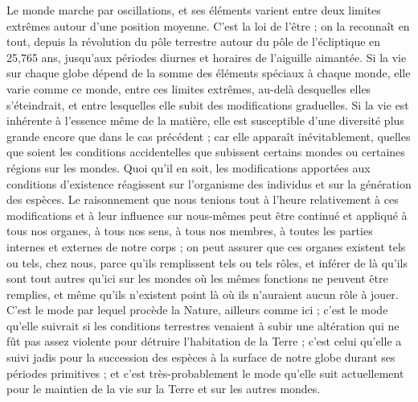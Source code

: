 \documentclass[a4paper, 11pt, oneside, landscape]{article}
\begin{document}
Le monde marche par oscillations, et ses éléments varient entre deux limites extrêmes autour d'une position moyenne. C'est la loi de l'être ; on la reconnaît en tout, depuis la révolution du pôle terrestre autour du pôle de l'écliptique en 25,765 ans, jusqu'aux périodes diurnes et horaires de l'aiguille aimantée. Si la vie sur chaque globe dépend de la somme des éléments spéciaux à chaque monde, elle varie comme ce monde, entre ces limites extrêmes, au-delà desquelles elles s'éteindrait, et entre lesquelles elle subit des modifications graduelles. Si la vie est inhérente à l'essence même de la matière, elle est susceptible d'une diversité plus grande encore que dans le cas précédent ; car elle apparaît inévitablement, quelles que soient les conditions accidentelles que subissent certains mondes ou certaines régions sur les mondes. Quoi qu'il en soit, les modifications apportées aux conditions d'existence réagissent sur l'organisme des individus et sur la génération des espèces. Le raisonnement que nous tenions tout à l'heure relativement à ces modifications et à leur influence sur nous-mêmes peut être continué et appliqué à tous nos organes, à tous nos sens, à tous nos membres, à toutes les parties internes et externes de notre corps ; on peut assurer que ces organes existent tels ou tels, chez nous, parce qu'ils remplissent tels ou tels rôles, et inférer de là qu'ils sont tout autres qu'ici sur les mondes où les mêmes fonctions ne peuvent être remplies, et même qu'ils n'existent point là où ils n'auraient aucun rôle à jouer. C'est le mode par lequel procède la Nature, ailleurs comme ici ; c'est le mode qu'elle suivrait si les conditions terrestres venaient à subir une altération qui ne fût pas assez violente pour détruire l'habitation de la Terre ; c'est celui qu'elle a suivi jadis pour la succession des espèces à la surface de notre globe durant ses périodes primitives ; et c'est très-probablement le mode qu'elle suit actuellement pour le maintien de la vie sur la Terre et sur les autres mondes.
\end{document}
